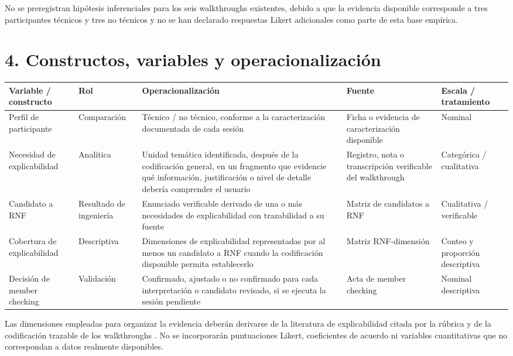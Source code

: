 \documentclass[9pt,a4paper]{extarticle}
\begin{document}
No se preregistran hipótesis inferenciales para los seis walkthroughs existentes, debido a que la evidencia disponible corresponde a tres participantes técnicos y tres no técnicos y no se han declarado respuestas Likert adicionales como parte de esta base empírica.

\section*{4. Constructos, variables y operacionalización}

\begin{longtable}{@{}p{}p{}p{}p{}p{}@{}}
\toprule
\textbf{Variable / constructo} & \textbf{Rol} & \textbf{Operacionalización} & \textbf{Fuente} & \textbf{Escala / tratamiento} \\
\midrule
\endhead
Perfil de participante & Comparación & Técnico / no técnico, conforme a la caracterización documentada de cada sesión & Ficha o evidencia de caracterización disponible & Nominal \\
Necesidad de explicabilidad & Analítica & Unidad temática identificada, después de la codificación general, en un fragmento que evidencie qué información, justificación o nivel de detalle debería comprender el usuario & Registro, nota o transcripción verificable del walkthrough & Categórica / cualitativa \\
Candidato a RNF & Resultado de ingeniería & Enunciado verificable derivado de una o más necesidades de explicabilidad con trazabilidad a su fuente & Matriz de candidatos a RNF & Cualitativa / verificable \\
Cobertura de explicabilidad & Descriptiva & Dimensiones de explicabilidad representadas por al menos un candidato a RNF cuando la codificación disponible permita establecerlo & Matriz RNF-dimensión & Conteo y proporción descriptiva \\
Decisión de member checking & Validación & Confirmado, ajustado o no confirmado para cada interpretación o candidato revisado, si se ejecuta la sesión pendiente & Acta de member checking & Nominal descriptiva \\
\bottomrule
\end{longtable}

Las dimensiones empleadas para organizar la evidencia deberán derivarse de la literatura de explicabilidad citada por la rúbrica y de la codificación trazable de los walkthroughs \cite{chazette2020,chazette2021,chazette2022}. No se incorporarán puntuaciones Likert, coeficientes de acuerdo ni variables cuantitativas que no correspondan a datos realmente disponibles.
\end{document}
